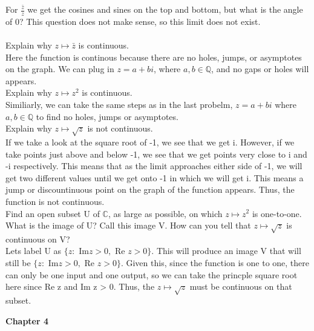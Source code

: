 \documentclass[12pt]{article}
\begin{document}
For $\frac{\bar{z}}{z}$ we get the cosines and sines on the top and bottom, but what is the angle of 0? 
This question does not make sense, so this limit does not exist.\\

 \\

 Explain why $z \mapsto \bar{z}$ is continuous.\\

Here the function is continous because there are no holes, jumps, or asymptotes on the graph.
We can plug in $z = a + bi$, where $a,b \in \mathbb{Q}$, and no gaps or holes will appears.\\

 Explain why $z \mapsto z^2$ is continuous.\\

Similiarly, we can take the same steps as in the last probelm, $z = a + bi$ where $a,b \in \mathbb{Q}$ to find no holes, jumps or asymptotes.\\

 Explain why $z \mapsto \sqrt{z}$ is not continuous.\\

If we take a look at the square root of -1, we see that we get i. 
However, if we take points just above and below -1, we see that we get points very close to i and -i respectively. 
This means that as the limit approaches either side of -1, we will get two different values until we get onto -1 in which we will get i.
This means a jump or discountinuous point on the graph of the function appears.
Thus, the function is not continuous.\\


 Find an open subset U of $\mathbb{C}$, as large as possible, on which $z \mapsto z^2$ is one-to-one.
What is the image of U? Call this image V. 
How can you tell that $z \mapsto \sqrt{z}$ is continuous on V?\\

Lets label U as $\{z : $ Im$ z > 0, $ Re $z > 0 \}$.
This will produce an image V that will still be $\{z : $ Im$ z > 0, $ Re $z > 0 \}$.
Given this, since the function is one to one, there can only be one input and one output, so we can take the princple square root here since Re z and Im z > 0.
Thus, the $z \mapsto \sqrt{z}$ must be continuous on that subset.\\


\begin{center}
\textbf{\large Chapter 4}
\end{center}
\end{document}
